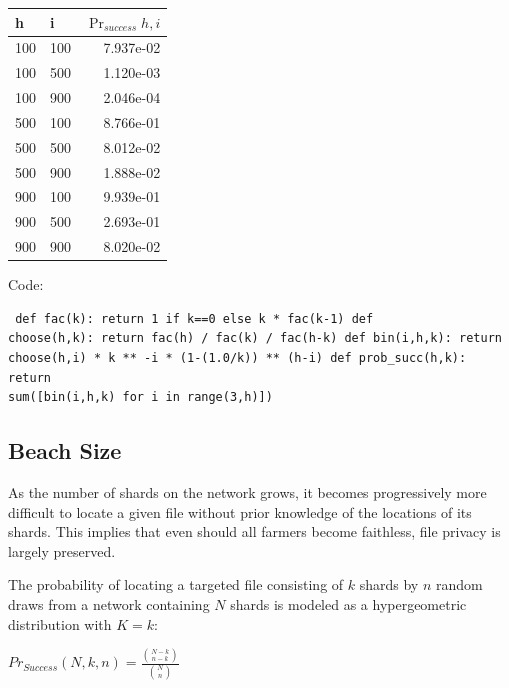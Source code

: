 \documentclass[a4paper,10pt]{article} \usepackage[utf8]{inputenc}
\begin{document}
\begin{table}[hbt!] \begin{center} \begin{tabular}{l l r} h & i &
$\Pr_{success}{h,i}$\\ \hline  100 & 100 & 7.937e-02\\ \hline  100 & 500 &
1.120e-03\\ \hline  100 & 900 & 2.046e-04\\ \hline  500 & 100 & 8.766e-01\\
\hline  500 & 500 & 8.012e-02\\ \hline  500 & 900 & 1.888e-02\\ \hline  900 &
100 & 9.939e-01\\ \hline  900 & 500 & 2.693e-01\\ \hline  900 & 900 &
8.020e-02\\ \end{tabular} \end{center} \end{table}

Code: \begin{lstlisting} def fac(k): return 1 if k==0 else k * fac(k-1) def
choose(h,k): return fac(h) / fac(k) / fac(h-k) def bin(i,h,k): return
choose(h,i) * k ** -i * (1-(1.0/k)) ** (h-i) def prob_succ(h,k): return
sum([bin(i,h,k) for i in range(3,h)]) \end{lstlisting}

\subsection{Beach Size}

As the number of shards on the network grows, it becomes progressively more
difficult to locate a given file without prior knowledge of the locations of its
shards. This implies that even should all farmers become faithless, file privacy
is largely preserved.

The probability of locating a targeted file consisting of $ k $ shards by $ n $
random draws from a network containing $ N $ shards is modeled as a
hypergeometric distribution with $ K = k $:

{\centering $Pr_{Success}(N,k,n) = \displaystyle \frac{{N-k \choose n-k}}{{N
\choose n}}$ \\}
\end{document}
